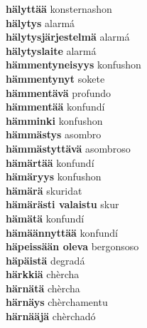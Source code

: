 \textbf{ hälyttää  } konsternashon \\
\textbf{ hälytys  } alarmá \\
\textbf{ hälytysjärjestelmä  } alarmá \\
\textbf{ hälytyslaite  } alarmá \\
\textbf{ hämmentyneisyys  } konfushon \\
\textbf{ hämmentynyt  } sokete \\
\textbf{ hämmentävä  } profundo \\
\textbf{ hämmentää  } konfundí \\
\textbf{ hämminki  } konfushon \\
\textbf{ hämmästys  } asombro \\
\textbf{ hämmästyttävä  } asombroso \\
\textbf{ hämärtää  } konfundí \\
\textbf{ hämäryys  } konfushon \\
\textbf{ hämärä  } skuridat \\
\textbf{ hämärästi valaistu  } skur \\
\textbf{ hämätä  } konfundí \\
\textbf{ hämäännyttää  } konfundí \\
\textbf{ häpeissään oleva  } bergonsoso \\
\textbf{ häpäistä  } degradá \\
\textbf{ härkkiä  } chèrcha \\
\textbf{ härnätä  } chèrcha \\
\textbf{ härnäys  } chèrchamentu \\
\textbf{ härnääjä  } chèrchadó \\
